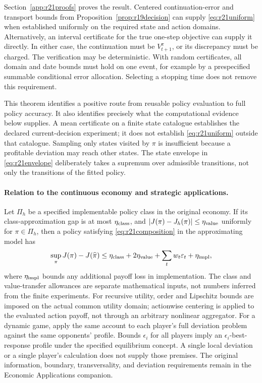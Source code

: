 \documentclass[ecta,nameyear,draft]{econsocart}
\theoremstyle{definition}
\theoremstyle{remark}
\begin{document}
Section~\ref{app:r21proofs} proves the result. Centered continuation-error
and transport bounds from Proposition~\ref{prop:r19decision} can supply
\eqref{eq:r21uniform} when established uniformly on the required state and
action domains. Alternatively, an interval certificate for the true
one-step objective can supply it directly. In either case, the continuation
must be $V_{t+1}^\pi$, or its discrepancy must be charged. The verification
may be deterministic. With random certificates, all domain and date bounds
must hold on one event, for example by a prespecified summable conditional
error allocation. Selecting a stopping time does not remove this requirement.

This theorem identifies a positive route from reusable policy evaluation to
full policy accuracy. It also identifies precisely what the computational
evidence below supplies. A mean certificate on a finite state catalogue
establishes the declared current-decision experiment; it does not establish
\eqref{eq:r21uniform} outside that catalogue. Sampling only states visited by
$\pi$ is insufficient because a profitable deviation may reach other states.
The state envelope in \eqref{eq:r21envelope} deliberately takes a supremum
over admissible transitions, not only the transitions of the fitted policy.

\paragraph{Relation to the continuous economy and strategic applications.}
Let $\Pi_h$ be a specified implementable policy class in the original economy.
If its class-approximation gap is at most $\eta_{\rm class}$, and
$|J(\pi)-J_h(\pi)|\leq\eta_{\rm value}$ uniformly for $\pi\in\Pi_h$, then a
policy satisfying \eqref{eq:r21composition} in the approximating model has
\begin{equation}
 \sup_{\pi}J(\pi)-J(\widehat\pi)
 \leq\eta_{\rm class}+2\eta_{\rm value}
       +\sum_t w_t\varepsilon_t+\eta_{\rm impl},
 \label{eq:r21bridge}
\end{equation}
where $\eta_{\rm impl}$ bounds any additional payoff loss in implementation.
The class and value-transfer allowances are separate mathematical inputs,
not numbers inferred from the finite experiments. For recursive utility,
order and Lipschitz bounds are imposed on the actual common utility domain;
actionwise centering is applied to the evaluated action payoff, not through
an arbitrary nonlinear aggregator. For a dynamic game, apply the same
account to each player's full deviation problem against the same opponents'
profile. Bounds $\epsilon_i$ for all players imply an $\epsilon_i$-best-response
profile under the specified equilibrium concept. A single local deviation
or a single player's calculation does not supply those premises. The original
information, boundary, transversality, and deviation requirements remain in
the Economic Applications companion.
\end{document}
